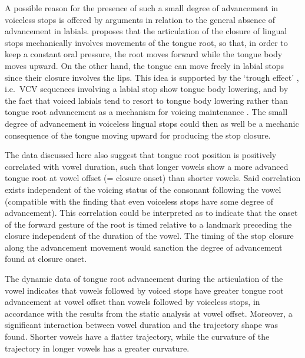 \documentclass[12pt,]{article}
\begin{document}
A possible reason for the presence of such a small degree of advancement
in voiceless stops is offered by arguments in relation to the general
absence of advancement in labials. \citet{westbury1983} proposes that
the articulation of the closure of lingual stops mechanically involves
movements of the tongue root, so that, in order to keep a constant oral
pressure, the root moves forward while the tongue body moves upward. On
the other hand, the tongue can move freely in labial stops since their
closure involves the lips. This idea is supported by the `trough effect'
\citep{vazquez-alvarez2007}, i.e.~VCV sequences involving a labial stop
show tongue body lowering, and by the fact that voiced labials tend to
resort to tongue body lowering rather than tongue root advancement as a
mechanism for voicing maintenance
\citep{perkell1969, westbury1983, ahn2018}. The small degree of
advancement in voiceless lingual stops could then as well be a mechanic
consequence of the tongue moving upward for producing the stop closure.

The data discussed here also suggest that tongue root position is
positively correlated with vowel duration, such that longer vowels show
a more advanced tongue root at vowel offset (= closure onset) than
shorter vowels. Said correlation exists independent of the voicing
status of the consonant following the vowel (compatible with the finding
that even voiceless stops have some degree of advancement). This
correlation could be interpreted as to indicate that the onset of the
forward gesture of the root is timed relative to a landmark preceding
the closure independent of the duration of the vowel. The timing of the
stop closure along the advancement movement would sanction the degree of
advancement found at closure onset.

The dynamic data of tongue root advancement during the articulation of
the vowel indicates that vowels followed by voiced stops have greater
tongue root advancement at vowel offset than vowels followed by
voiceless stops, in accordance with the results from the static analysis
at vowel offset. Moreover, a significant interaction between vowel
duration and the trajectory shape was found. Shorter vowels have a
flatter trajectory, while the curvature of the trajectory in longer
vowels has a greater curvature.
\end{document}
